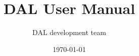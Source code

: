 \documentclass[a4paper,fontsize=10pt]{scrreprt}
\begin{document}
\pagestyle{fancy}
\renewcommand{\footrulewidth}{0.4pt}
\fancyfoot[C]{}
\fancyfoot[R]{\thepage}

\title{DAL User Manual}
\author{DAL development team}
\date{\today}
\maketitle{}

\tableofcontents
\end{document}
